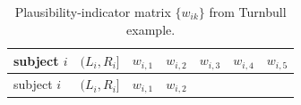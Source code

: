 \documentclass[
  letterpaper,
  krantz2]{style/krantz}
\begin{document}
\begin{longtable}[]{@{}
  >{\raggedright\arraybackslash}p{}
  >{\raggedright\arraybackslash}p{}
  >{\raggedright\arraybackslash}p{}
  >{\raggedright\arraybackslash}p{}
  >{\raggedright\arraybackslash}p{}
  >{\raggedright\arraybackslash}p{}
  >{\raggedright\arraybackslash}p{}@{}}
\caption{Plausibility-indicator matrix \(\{w_{ik}\}\) from Turnbull
example.}\label{tbl-turnbull}\tabularnewline
\toprule\noalign{}
\begin{minipage}[b]{\linewidth}\raggedright
subject \(i\)
\end{minipage} & \begin{minipage}[b]{\linewidth}\raggedright
\((L_i, R_i]\)
\end{minipage} & \begin{minipage}[b]{\linewidth}\raggedright
\(w_{i,1}\)
\end{minipage} & \begin{minipage}[b]{\linewidth}\raggedright
\(w_{i,2}\)
\end{minipage} & \begin{minipage}[b]{\linewidth}\raggedright
\(w_{i,3}\)
\end{minipage} & \begin{minipage}[b]{\linewidth}\raggedright
\(w_{i,4}\)
\end{minipage} & \begin{minipage}[b]{\linewidth}\raggedright
\(w_{i,5}\)
\end{minipage} \\
\midrule\noalign{}
\endfirsthead
\toprule\noalign{}
\begin{minipage}[b]{\linewidth}\raggedright
subject \(i\)
\end{minipage} & \begin{minipage}[b]{\linewidth}\raggedright
\((L_i, R_i]\)
\end{minipage} & \begin{minipage}[b]{\linewidth}\raggedright
\(w_{i,1}\)
\end{minipage} & \begin{minipage}[b]{\linewidth}\raggedright
\(w_{i,2}\)
\end{minipage} & \begin{minipage}[b]{\linewidth}\raggedright

\end{minipage}
\end{longtable}
\end{document}
